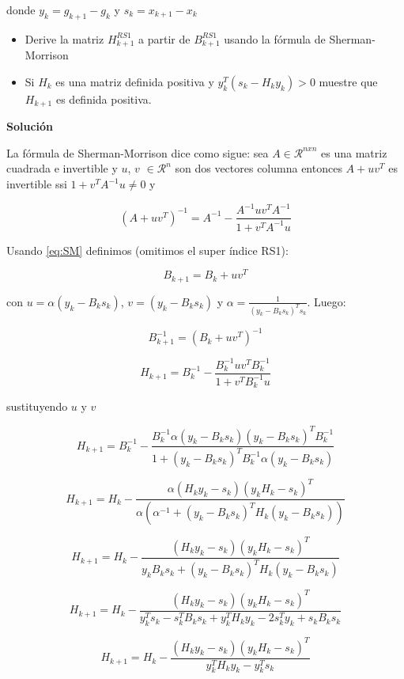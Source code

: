 \documentclass[conference]{IEEEtran}
\begin{document}
donde $y_k = g_{k+1} - g_k$ y $s_{k} = x_{k+1} - x_k$

\begin{itemize}
    \item Derive la matriz $H_{k+1}^{RS1}$ a partir de $B_{k+1}^{RS1}$ usando la fórmula de Sherman-Morrison
    \item Si $H_k$ es una matriz definida positiva y $y_k^T(s_k - H_k y_k) > 0 $ muestre que $H_{k+1}$ es definida positiva.
\end{itemize}



\textbf{Solución} \newline

La fórmula de Sherman-Morrison dice como sigue: sea $A \in \mathcal{R}^{nxn}$ es una matriz cuadrada e
invertible y $u$, $v$ $\in \mathcal{R}^{n}$ son dos vectores columna entonces $A + uv^T$ es
invertible ssi $1 + v^TA^{-1}u \ne 0$ y

\begin{equation}
    (A + uv^T)^{-1} = A^{-1} - \frac{A^{-1} u v^T A^{-1}}{1 + v^T A^{-1} u}
    \label{eq:SM}
\end{equation}

Usando \eqref{eq:SM} definimos (omitimos el super índice RS1):

$$
    B_{k+1} = B_{k} + u v^T
$$

con $u = \alpha (y_k - B_k s_k)$, $v = (y_k - B_k s_k)$ y
$\alpha = \frac{1}{(y_k - B_k s_k)^T s_k}$. Luego:

$$
    B_{k+1}^{-1} = (B_{k} + u v^T)^{-1}
$$

$$
    H_{k+1} = B_k^{-1} - \frac{B_k^{-1} u v^T B_k^{-1}}{1 + v^T B_k^{-1} u}
$$

sustituyendo $u$ y $v$

$$
    H_{k+1} = B_k^{-1} - \frac{B_k^{-1} \alpha (y_k - B_k s_k) (y_k - B_k s_k)^T B_k^{-1}}{1 + (y_k - B_k s_k)^T B_k^{-1} \alpha (y_k - B_k s_k)}
$$

$$
H_{k+1} = H_k - \frac{\alpha (H_ky_k - s_k) (y_k H_k - s_k)^T }{\alpha(\alpha^{-1} + (y_k - B_k s_k)^T H_k (y_k - B_k s_k))}
$$

$$
H_{k+1} = H_k - \frac{(H_ky_k - s_k) (y_k H_k - s_k)^T }{ y_k B_k s_k + (y_k - B_k s_k)^T H_k (y_k - B_k s_k)}
$$

$$
H_{k+1} = H_k - \frac{(H_ky_k - s_k) (y_k H_k - s_k)^T }{ y_k^T s_k - s_k^T B_k s_k + y_k^T H_k y_k  - 2s_k^T y_k + s_k B_k s_k}
$$

$$
H_{k+1} = H_k - \frac{(H_ky_k - s_k) (y_k H_k - s_k)^T }{y_k^T H_k y_k - y_k^T s_k}
$$
\end{document}
